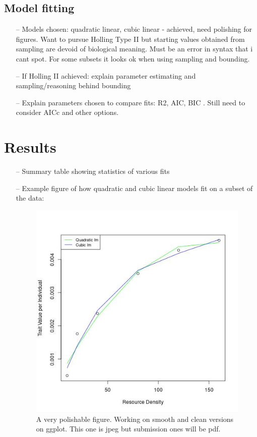 \documentclass[11pt]{article}
\begin{document}
    \subsection{Model fitting}
      \begin{itemize}
        \item[--] Models chosen: quadratic linear, cubic linear - achieved, need polishing for figures. Want to pursue Holling Type II but starting
        values obtained from sampling are devoid of biological meaning. Must be an error in syntax that i cant spot. For some subsets it looks ok when using sampling and bounding.
        \item[--] If Holling II achieved: explain parameter estimating and sampling/reasoning behind bounding
        \item[--] Explain parameters chosen to compare fits: R2, AIC, BIC . Still need to consider AICc and other options.
      \end{itemize}

  \section{Results}
    \begin{itemize}
        \item[--] Summary table showing statistics of various fits
        \item[--] Example figure of how quadratic and cubic linear models fit on a subset of the data:
            \begin{figure}[h]
                \centering
                \includegraphics[scale=0.5]{subset_39882_plot.jpeg}  
                \caption{A very polishable figure. Working on smooth and clean versions on ggplot. This one is jpeg but submission ones will be pdf.}
            \end{figure}
    \end{itemize}
\end{document}
